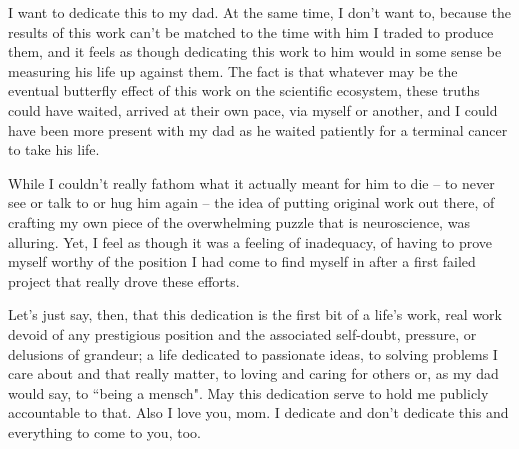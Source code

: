 \documentclass{ucbthesis}
\begin{document}
\begin{frontmatter}

\begin{dedication}
\null\vfil
I want to dedicate this to my dad. At the same time, I don't want to, because the results of this work can't be matched to the time with him I traded to produce them, and it feels as though dedicating this work to him would in some sense be measuring his life up against them. 
The fact is that whatever may be the eventual butterfly effect of this work on the scientific ecosystem, these truths could have waited, arrived at their own pace, via myself or another, and I could have been more present with my dad as he waited patiently for a terminal cancer to take his life. 

While I couldn't really fathom what it actually meant for him to die -- to never see or talk to or hug him again -- the idea of putting original work out there, of crafting my own piece of the overwhelming puzzle that is neuroscience, was alluring. Yet, I feel as though it was a feeling of inadequacy, of having to prove myself worthy of the position I had come to find myself in after a first failed project that really drove these efforts.

Let's just say, then, that this dedication is the first bit of a life's work, real work devoid of any prestigious position and the associated self-doubt, pressure, or delusions of grandeur; a life dedicated to passionate ideas, to solving problems I care about and that really matter, to loving and caring for others or, as my dad would say, to ``being a mensch". May this dedication serve to hold me publicly accountable to that. Also I love you, mom. I dedicate and don't dedicate this and everything to come to you, too.

\vspace{12pt}
\vfil\null
\end{dedication}


\end{frontmatter}
\end{document}
